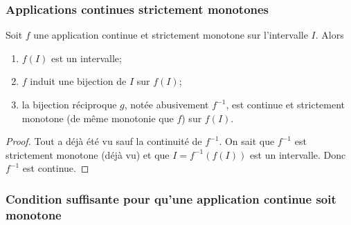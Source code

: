 \subsubsection{Applications continues strictement monotones}

\begin{theo}
  Soit \(f\) une application continue et strictement monotone sur l'intervalle 
  \(I\). Alors
  \begin{enumerate}
    \item \(f(I)\) est un intervalle;
    \item \(f\) induit une bijection de \(I\) sur \(f(I)\);
    \item la bijection réciproque \(g\), notée abusivement \(f^{-1}\), est 
      continue et strictement monotone (de même monotonie que \(f\)) sur 
      \(f(I)\).
  \end{enumerate}
\end{theo}
\begin{proof}
  Tout a déjà été vu sauf la continuité de \(f^{-1}\). On sait que \(f^{-1}\) 
  est strictement monotone (déjà vu) et que \(I=f^{-1}(f(I))\) est un 
  intervalle. Donc \(f^{-1}\) est continue.
\end{proof}

\subsubsection[Pour qu'une application continue soit monotone]{Condition 
suffisante pour qu'une application continue soit monotone}

